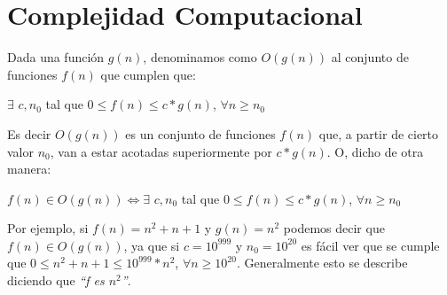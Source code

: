 \newpage
\section{Complejidad Computacional}

Dada una funci\'on $g(n)$, denominamos como $O(g(n))$ al conjunto de funciones $f(n)$ que cumplen que:

\begin{center}
$\exists$ $c, n_0$ tal que $0 \leq f(n) \leq c * g(n)$, $\forall n \geq n_0$  
\end{center}

\begin{figure}[htb]
    \centering
    
\end{figure}

Es decir $O(g(n))$ es un conjunto de funciones $f(n)$ que, a partir de cierto valor $n_0$, van a estar acotadas superiormente por $c * g(n)$. O, dicho de otra manera:

\begin{center}
$f(n) \in O(g(n)) \iff \exists$ $c, n_0$ tal que $0 \leq f(n) \leq c * g(n)$, $\forall n \geq n_0$  
\end{center}

Por ejemplo, si $f(n) = n^2 + n + 1$ y $g(n) = n^2$ podemos decir que $f(n) \in O(g(n))$, ya que si $c = 10^{999}$ y $n_0 = 10^{20}$ es f\'acil ver que se cumple que $0 \leq n^2 + n + 1 \leq 10^{999} * n^{2}$, $\forall n \geq 10^{20}$. Generalmente esto se describe diciendo que \emph{``f es $n^{2}$''}.
